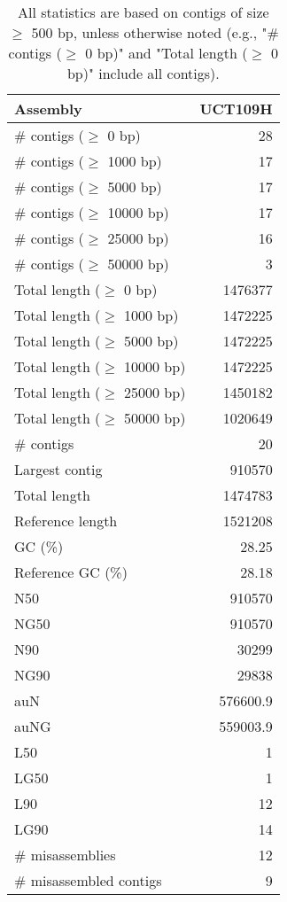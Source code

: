 \documentclass[12pt,a4paper]{article}
\begin{document}
\begin{table}[ht]
\begin{center}
\caption{All statistics are based on contigs of size $\geq$ 500 bp, unless otherwise noted (e.g., "\# contigs ($\geq$ 0 bp)" and "Total length ($\geq$ 0 bp)" include all contigs).}
\begin{tabular}{|l*{1}{|r}|}
\hline
Assembly & UCT109H \\ \hline
\# contigs ($\geq$ 0 bp) & 28 \\ \hline
\# contigs ($\geq$ 1000 bp) & 17 \\ \hline
\# contigs ($\geq$ 5000 bp) & 17 \\ \hline
\# contigs ($\geq$ 10000 bp) & 17 \\ \hline
\# contigs ($\geq$ 25000 bp) & 16 \\ \hline
\# contigs ($\geq$ 50000 bp) & 3 \\ \hline
Total length ($\geq$ 0 bp) & 1476377 \\ \hline
Total length ($\geq$ 1000 bp) & 1472225 \\ \hline
Total length ($\geq$ 5000 bp) & 1472225 \\ \hline
Total length ($\geq$ 10000 bp) & 1472225 \\ \hline
Total length ($\geq$ 25000 bp) & 1450182 \\ \hline
Total length ($\geq$ 50000 bp) & 1020649 \\ \hline
\# contigs & 20 \\ \hline
Largest contig & 910570 \\ \hline
Total length & 1474783 \\ \hline
Reference length & 1521208 \\ \hline
GC (\%) & 28.25 \\ \hline
Reference GC (\%) & 28.18 \\ \hline
N50 & 910570 \\ \hline
NG50 & 910570 \\ \hline
N90 & 30299 \\ \hline
NG90 & 29838 \\ \hline
auN & 576600.9 \\ \hline
auNG & 559003.9 \\ \hline
L50 & 1 \\ \hline
LG50 & 1 \\ \hline
L90 & 12 \\ \hline
LG90 & 14 \\ \hline
\# misassemblies & 12 \\ \hline
\# misassembled contigs & 9 \\ \hline

\end{tabular}
\end{center}
\end{table}
\end{document}
